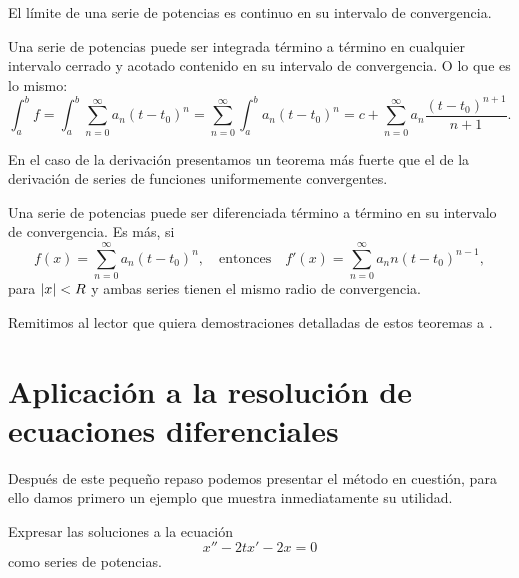 \documentclass[../ecuaciones_diferenciales.tex]{subfiles}
\begin{document}
\begin{corollary}
	El límite de una serie de potencias es continuo en su intervalo de
	convergencia.
\end{corollary}

\begin{theorem}[Integración]
	Una serie de potencias puede ser integrada término a término en cualquier
	intervalo cerrado y acotado contenido en su intervalo de convergencia. O lo
	que es lo mismo:
	\[\int_a^b f = \int_a^b \sum_{n = 0}^\infty a_n (t - t_0)^n
		= \sum_{n = 0}^\infty \int_a^b a_n (t - t_0)^n
		= c + \sum_{n = 0}^\infty a_n \frac{(t - t_0)^{n + 1}}{n + 1}.\]
\end{theorem}

En el caso de la derivación presentamos un teorema más fuerte que el de la
derivación de series de funciones uniformemente convergentes.

\begin{theorem}[Diferenciación]
	Una serie de potencias puede ser diferenciada término a término en su
	intervalo de convergencia. Es más, si
	\[f(x) = \sum_{n = 0}^\infty a_n (t - t_0)^n, \quad \text{entonces} \quad
		f'(x) = \sum_{n = 0}^\infty a_n n (t - t_0)^{n - 1},\]
	para \(\abs{x} < R\) y ambas series tienen el mismo radio de convergencia.
\end{theorem}

Remitimos al lector que quiera demostraciones detalladas de estos
teoremas a \cite[capítulo~9.4]{introduction_real_analysis}.

\section{Aplicación a la resolución de ecuaciones diferenciales}

Después de este pequeño repaso podemos presentar el método en cuestión, para
ello damos primero un ejemplo que muestra inmediatamente su utilidad.
\begin{example}
	Expresar las soluciones a la ecuación
	\begin{equation} \label{eq:eqpot}
		x''-2tx'-2x=0
	\end{equation}
	como series de potencias.
\end{example}
\end{document}
